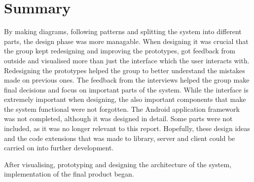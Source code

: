 \chapter{Summary}

By making diagrams, following patterns and splitting the system into different parts, the design phase was more managable.
When designing it was crucial that the group kept redesigning and improving the prototypes, got feedback from outside and visualised more than just the interface which the user interacts with.
Redesigning the prototypes helped the group to better understand the mistakes made on previous ones.
The feedback from the interviews helped the group make final decisions and focus on important parts of the system.
While the interface is extremely important when designing, the also important components that make the system functional were not forgotten.
The Android application framework was not completed, although it was designed in detail. Some parts were not included, as it was no longer relevant to this report. Hopefully, these design ideas and the code extensions that was made to library, server and client could be carried on into further development. 

After visualising, prototyping and designing the architecture of the system, implementation of the final product began.


